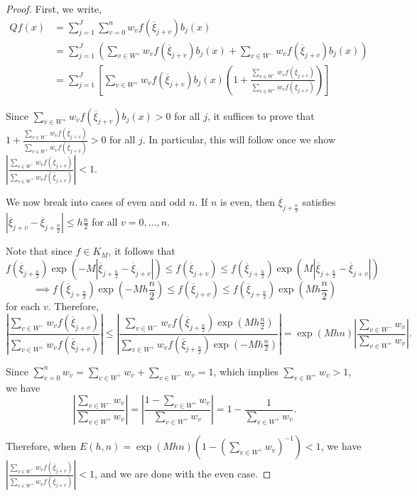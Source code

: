 \documentclass[10pt]{article}
\newcommand{\fracn}{\frac{n}{2}}
\theoremstyle{definition}
\numberwithin{equation}{section}
\numberwithin{figure}{section}
\numberwithin{table}{section}
\begin{document}
\begin{proof}
First, we write,
\begin{align*}
    Qf(x)&=\sum_{j=1}^J\sum_{v=0}^nw_vf(\overline\xi_{j+v})b_j(x)\\
    &=\sum_{j=1}^J\left(\sum_{v\in W^+}w_vf(\overline\xi_{j+v})b_j(x)+\sum_{v\in W^-}w_vf(\overline\xi_{j+v})b_j(x)\right)\\
    &=\sum_{j=1}^J\left[\sum_{v\in W^+}w_vf(\overline\xi_{j+v})b_j(x)\left(1+\frac{\sum_{v\in W^-}w_vf(\overline\xi_{j+v})}{\sum_{v\in W^+}w_vf(\overline\xi_{j+v})}\right)\right]
\end{align*}

Since $\sum_{v\in W^+}w_vf(\overline\xi_{j+v})b_j(x)>0$ for all $j$, it suffices to prove that $1+\frac{\sum_{v\in W^-}w_vf(\overline\xi_{j+v})}{\sum_{v\in W^+}w_vf(\overline\xi_{j+v})}>0$ for all $j$. In particular, this will follow once we show $\left|\frac{\sum_{v\in W^-}w_vf(\overline\xi_{j+v})}{\sum_{v\in W^+}w_vf(\overline\xi_{j+v})}\right|<1$.

We now break into cases of even and odd $n$. If $n$ is even, then $\overline\xi_{j+\fracn}$ satisfies $|\overline\xi_{j+v}-\overline\xi_{j+\fracn}|\leq h\fracn$ for all $v=0,\dots,n$.

Note that since $f\in K_M$, it follows that
$$f(\overline\xi_{j+\fracn})\exp(-M|\overline\xi_{j+\fracn}-\overline\xi_{j+v}|)\leq f(\overline\xi_{j+v})\leq f(\overline\xi_{j+\fracn})\exp(M|\overline\xi_{j+\fracn}-\overline\xi_{j+v}|)$$
$$\implies f(\overline\xi_{j+\fracn})\exp\left(-Mh\fracn\right)\leq f(\overline\xi_{j+v})\leq f(\overline\xi_{j+\fracn})\exp\left(Mh\fracn\right)$$
for each $v$. Therefore,
$$\left|\frac{\sum_{v\in W^-}w_vf(\overline\xi_{j+v})}{\sum_{v\in W^+}w_vf(\overline\xi_{j+v})}\right|\leq\left|\frac{\sum_{v\in W^-}w_vf(\overline\xi_{j+\fracn})\exp(Mh\fracn)}{\sum_{v\in W^+}w_vf(\overline\xi_{j+\fracn})\exp(-Mh\fracn)}\right|=\exp(Mhn)\left|\frac{\sum_{v\in W^-}w_v}{\sum_{v\in W^+}w_v}\right|.$$

Since $\sum_{v=0}^nw_v=\sum_{v\in W^+}w_v+\sum_{v\in W^-}w_v=1$, which implies $\sum_{v\in W^+}w_v>1$, we have
$$\left|\frac{\sum_{v\in W^-}w_v}{\sum_{v\in W^+}w_v}\right|=\left|\frac{1-\sum_{v\in W^+}w_v}{\sum_{v\in W^+}w_v}\right|=1-\frac{1}{\sum_{v\in W^+}w_v}.$$

Therefore, when $E(h,n)=\exp(Mhn)(1-(\sum_{v\in W^+}w_v)^{-1})<1$, we have $\left|\frac{\sum_{v\in W^-}w_vf(\overline\xi_{j+v})}{\sum_{v\in W^+}w_vf(\overline\xi_{j+v})}\right|<1$, and we are done with the even case.


\end{proof}
\end{document}
